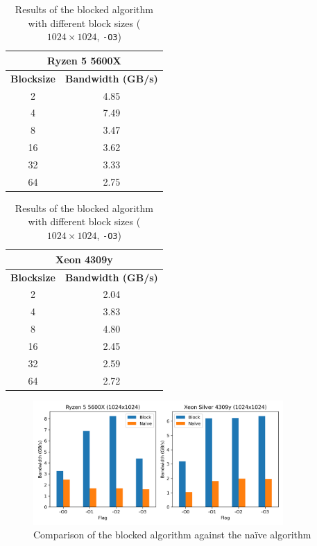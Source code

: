 \documentclass{article}
\begin{document}
\begin{table}[h]
    \centering
    \begin{tabular}{|c|c|}
        \hline
        \multicolumn{2}{|c|}{\textbf{Ryzen 5 5600X}} \\
        \hline
        \textbf{Blocksize } & \textbf{Bandwidth (GB/s)} \\ \hline
        2         & 4.85 \\ \hline
        \rowcolor{LightYellow}
        4         & 7.49 \\ \hline
        8         & 3.47 \\ \hline
        16        & 3.62 \\ \hline
        32        & 3.33 \\ \hline
        64        & 2.75 \\ \hline
    \end{tabular}
    \hspace{2em}
    \begin{tabular}{|c|c|}
        \hline
        \multicolumn{2}{|c|}{\textbf{Xeon 4309y}} \\
        \hline
        \textbf{Blocksize } & \textbf{Bandwidth (GB/s)} \\ \hline
        2         & 2.04 \\ \hline
        4         & 3.83 \\ \hline
        \rowcolor{LightYellow}
        8         & 4.80 \\ \hline
        16        & 2.45 \\ \hline
        32        & 2.59 \\ \hline
        64        & 2.72 \\ \hline
    \end{tabular}
    \caption{Results of the blocked algorithm with different block sizes ($1024 \times 1024$, \texttt{-O3})}
    \label{tab:blocked_results}
\end{table}
\begin{figure}[H]
    \centering
    \includegraphics[width=0.85\textwidth]{report/img/block_vs_naive.png}
    \caption{Comparison of the blocked algorithm against the na\"{i}ve algorithm}
    \label{fig:blocked_comparison}
\end{figure}
\end{document}
